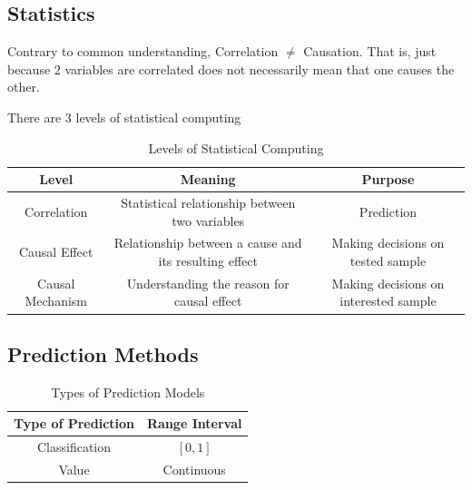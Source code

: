 \documentclass[
  english,
  doc,floatsintext]{apa6}
\begin{document}
\hypertarget{statistics}{%
\subsection{Statistics}\label{statistics}}

Contrary to common understanding, Correlation \(\ne\) Causation. That is, just because 2 variables are correlated does not necessarily mean that one causes the other.

There are 3 levels of statistical computing

\begin{table}[H]
  \begin{center}
  \begin{tabular}{|c|c|c|}
  \hline
  \textbf{Level} & \textbf{Meaning} & \textbf{Purpose}                               \\ \hline
  Correlation      & Statistical relationship between two variables        & Prediction                            \\ \hline
  Causal Effect    & Relationship between a cause and its resulting effect & Making decisions on tested sample     \\ \hline
  Causal Mechanism & Understanding the reason for causal effect            & Making decisions on interested sample \\ \hline
  \end{tabular}
  \end{center}
  
  \captionsetup{justification=centering}
  \caption{Levels of Statistical Computing}
\end{table}

\hypertarget{prediction-methods}{%
\subsection{Prediction Methods}\label{prediction-methods}}

\begin{table}[H]
  \begin{center}
  \begin{tabular}{|c|c|}
  \hline
  \textbf{Type of Prediction} & \textbf{Range Interval} \\ \hline
  Classification     & $[0,1]$        \\ \hline
  Value              & Continuous     \\ \hline
  \end{tabular}
  \end{center}

  \captionsetup{justification=centering}
  \caption{Types of Prediction Models}
\end{table}
\end{document}
